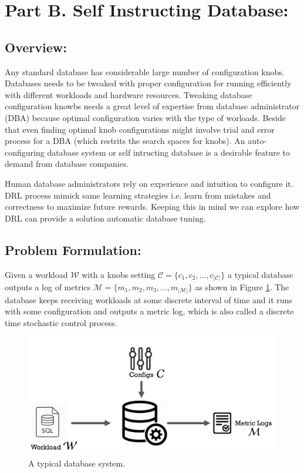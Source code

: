 \section{Part B.  Self Instructing Database:}
\label{part_b}
\subsection{Overview:}
Any standard database has considerable large number of configuration knobs. Databases needs to be tweaked with proper configuration for running efficiently with different workloads and hardware resources. Tweaking database configuration knowbs needs a great level of expertise from database administrator (DBA) because optimal configuration varies with the type of worloads. Beside that even finding optimal knob configurations might involve trial and error process for a DBA (which restrits the search spaces for knobs). An auto-configuring database system or self intructing database is a desirable feature to demand from database companies.


Human database administrators rely on experience and intuition to configure it. DRL process mimick same learning strategies i.e. learn from mistakes and correctness to maximize future rewards. Keeping this in mind we can explore how DRL can provide a solution automatic database tuning.


\subsection{Problem Formulation:}
Given a workload $\mathcal{W}$ with a knobs setting $\mathcal{C} = \{c_1,c_2,\ldots,c_{|\mathcal{C}|}\}$ a typical database outputs a log of metrics $\mathcal{M} = \{m_1,m_2,m_3,\ldots,m_{|\mathcal{M}|}\}$ as shown in Figure \ref{fig:database_01}.
The database keeps receiving workloads at some discrete interval of time and it runs with some configuration and outputs a metric log, which is also called a discrete time stochastic control process.

\begin{figure}[h]
	\includegraphics[width=0.9\linewidth ]{fig/database_01.png}
    \vspace{-2mm}
    \caption{A typical database system.}
    \label{fig:database_01}
\end{figure}


